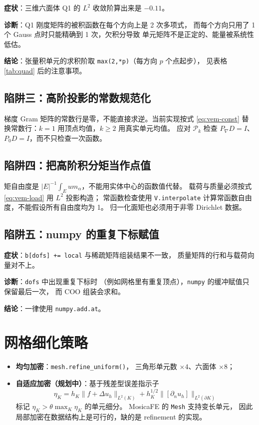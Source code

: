 \documentclass[UTF8,11pt,oneside]{ctexbook}
\theoremstyle{definition}
\theoremstyle{plain}
\newcommand{\mosica}{\textsf{MosicaFE}}
\newcommand{\code}[1]{\texttt{#1}}
\begin{document}
\textbf{症状}：三维六面体 Q1 的 $L^2$ 收敛阶算出来是 $-0.11$。

\textbf{诊断}：Q1 刚度矩阵的被积函数在每个方向上是 2 次多项式，
而每个方向只用了 1 个 Gauss 点时只能精确到 1 次，欠积分导致
单元矩阵不是正定的、能量被系统性低估。

\textbf{结论}：张量积单元的求积阶取 \code{max(2,*p)}（每方向 $p$ 个点起步），
见表格 \ref{tab:quad} 后的注意事项。

\subsection{陷阱三：高阶投影的常数规范化}
梯度 Gram 矩阵的常数行是零，不能直接求逆。当前实现按式 \eqref{eq:vem-const}
替换常数行：$k=1$ 用顶点均值，$k\ge2$ 用真实单元均值。
应对 $\mathcal P_k$ 检查 $P_\nabla D=I$、$P_0D=I$，而不只检查一次函数。

\subsection{陷阱四：把高阶积分矩当作点值}
矩自由度是 $|E|^{-1}\int_Eu m_\alpha$，不能用实体中心的函数值代替。
载荷与质量必须按式 \eqref{eq:vem-load} 用 $L^2$ 投影构造；
常函数检查使用 \code{V.interpolate} 计算常函数自由度，不能假设所有自由度均为 1。
归一化面矩也必须用于非零 Dirichlet 数据。

\subsection{陷阱五：numpy 的重复下标赋值}

\textbf{症状}：\code{b[dofs] += local} 与稀疏矩阵组装结果不一致，
质量矩阵的行和与载荷向量对不上。

\textbf{诊断}：\code{dofs} 中出现重复下标时
（例如网格里有重复顶点），\code{numpy} 的缓冲赋值只保留最后一次，
而 COO 组装会求和。

\textbf{结论}：一律使用 \code{numpy.add.at}。

\section{网格细化策略}

\begin{itemize}[itemsep=0.2em]
  \item \textbf{均匀加密}：\code{mesh.refine\_\allowbreak uniform()}，
        三角形单元数 $\times4$、六面体 $\times8$；
  \item \textbf{自适应加密（规划中）}：基于残差型误差指示子
        \begin{equation}
        \eta_K=h_K\|f+\Delta u_h\|_{L^2(K)}
        +h_K^{1/2}\|[\partial_n u_h]\|_{L^2(\partial K)}
        \label{eq:estimator}
        \end{equation}
        标记 $\eta_K>\theta\max_K\eta_K$ 的单元细分。
        \mosica{} 的 \code{Mesh} 支持变长单元，
        因此局部加密在数据结构上是可行的，缺的是 refinement 的实现。
\end{itemize}
\end{document}

